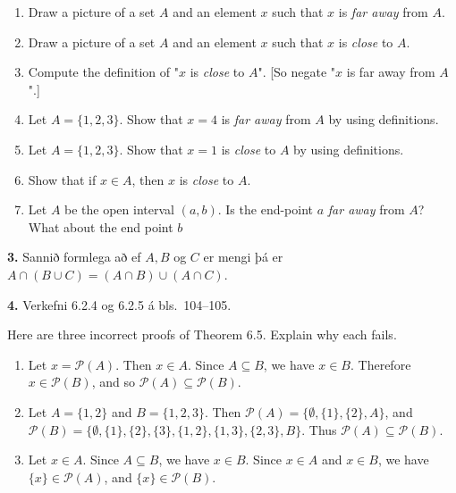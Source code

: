 \documentclass[12pt]{article}
\begin{document}
\begin{enumerate}[label=(\alph*),itemsep=0pt]
	\item Draw a  picture of a set $A$ and an element $x$ such that $x$ is \emph{far away} from $A$.
	\item Draw a  picture of a set $A$ and an element $x$ such that $x$ is \emph{close} to $A$.
	\item Compute the definition of "$x$ is \emph{close} to $A$". [So negate "$x$ is far away from $A$".]
	\item Let $A=\{ 1,2,3\} $. Show that $x=4$ is \emph{far away} from $A$ by using definitions.
	\item Let $A=\{ 1,2,3\} $. Show that $x=1$ is \emph{close} to $A$ by using definitions.
	\item Show that if $x\in A$, then $x$ is \emph{close} to $A$.
	\item Let $A$ be the open interval $(a,b)$. Is the end-point $a$ \emph{far away} from $A$? What about the end point $b$
\end{enumerate}

\smallskip

{\bf 3.}  Sannið formlega að ef $A, B$ og $C$ er mengi þá er $A\cap (B\cup C)=(A\cap B)\cup (A\cap C)$.

\smallskip

{\bf 4.}  Verkefni 6.2.4 og 6.2.5 á bls.~104--105.

Here are three incorrect proofs of Theorem 6.5. Explain why each fails.

\begin{enumerate}[label=(\alph*),itemsep=0pt]
	\item Let $x=\mathcal{P} (A)$. Then $x\in A$. Since $A\subseteq B$, we have $x\in B$. Therefore $x\in \mathcal{P} (B)$, and so $\mathcal{P} (A) \subseteq \mathcal{P} (B)$.
	\item Let $A=\{ 1,2\} $ and $B=\{ 1,2,3\} $. Then $\mathcal{P}(A)=\{ \emptyset , \{ 1\} ,\{ 2\} ,A\} $, and $\mathcal{P}(B)=\{ \emptyset ,\{ 1\} ,\{ 2\} ,\{ 3\} ,\{ 1,2\} ,\{ 1,3\} ,\{ 2,3\} ,B\} $. Thus $\mathcal{P}(A)\subseteq \mathcal{P}(B)$.
	\item Let $x\in A$. Since $A\subseteq B$, we have $x\in B$. Since $x\in A$ and $x\in B$, we have $\{ x\} \in \mathcal{P}(A)$, and $\{ x\} \in \mathcal{P}(B)$.
\end{enumerate}
\end{document}
